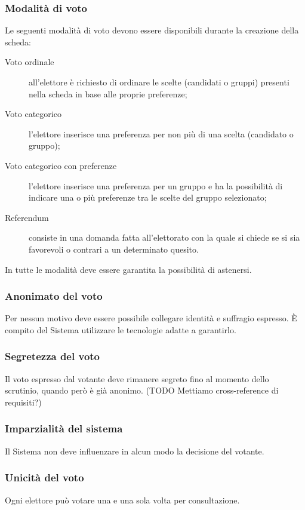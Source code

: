 \documentclass{report}
\begin{document}
\subsubsection{Modalità di voto}
Le seguenti modalità di voto devono essere disponibili durante la creazione della scheda:
\begin{description}
	\item[Voto ordinale] all'elettore è richiesto di ordinare le scelte (candidati o gruppi) presenti nella scheda in base alle proprie preferenze;
	\item[Voto categorico] l'elettore inserisce una preferenza per non più di una scelta (candidato o gruppo);
	\item[Voto categorico con preferenze] l'elettore inserisce una preferenza per un gruppo e ha la possibilità di indicare una o più preferenze tra le scelte del gruppo selezionato;
	\item[Referendum] consiste in una domanda fatta all'elettorato con la quale si chiede se si sia favorevoli o contrari a un determinato quesito.
\end{description}

In tutte le modalità deve essere garantita la possibilità di astenersi.

\subsubsection{Anonimato del voto}
Per nessun motivo deve essere possibile collegare identità e suffragio espresso. È compito del Sistema utilizzare le tecnologie adatte a garantirlo.

\subsubsection{Segretezza del voto}
Il voto espresso dal votante deve rimanere segreto fino al momento dello scrutinio, quando però è già anonimo. (TODO Mettiamo cross-reference di requisiti?)

\subsubsection{Imparzialità del sistema}
Il Sistema non deve influenzare in alcun modo la decisione del votante.

\subsubsection{Unicità del voto}
Ogni elettore può votare una e una sola volta per consultazione.
\end{document}
